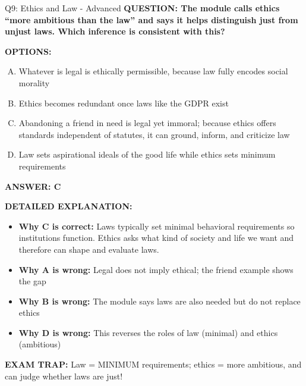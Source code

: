 \documentclass[8pt]{beamer}
\begin{document}
\begin{frame}[shrink=6]{Q9: Ethics and Law - Advanced}
\fontsize{6.5}{7.5}\selectfont
\textbf{QUESTION: The module calls ethics ``more ambitious than the law'' and says it helps distinguish just from unjust laws. Which inference is consistent with this?}

\vspace{0.1cm}
\textbf{OPTIONS:}
\begin{enumerate}[A.]
\item Whatever is legal is ethically permissible, because law fully encodes social morality
\item Ethics becomes redundant once laws like the GDPR exist
\item Abandoning a friend in need is legal yet immoral; because ethics offers standards independent of statutes, it can ground, inform, and criticize law
\item Law sets aspirational ideals of the good life while ethics sets minimum requirements
\end{enumerate}

\vspace{0.1cm}
\textcolor{myblue}{\textbf{ANSWER: C}}

\vspace{0.1cm}
\textbf{DETAILED EXPLANATION:}
\begin{itemize}
\item \textbf{Why C is correct:} Laws typically set minimal behavioral requirements so institutions function. Ethics asks what kind of society and life we want and therefore can shape and evaluate laws.
\item \textbf{Why A is wrong:} Legal does not imply ethical; the friend example shows the gap
\item \textbf{Why B is wrong:} The module says laws are also needed but do not replace ethics
\item \textbf{Why D is wrong:} This reverses the roles of law (minimal) and ethics (ambitious)
\end{itemize}

\textcolor{myred}{\textbf{EXAM TRAP:}} Law = MINIMUM requirements; ethics = more ambitious, and can judge whether laws are just!
\end{frame}

\end{document}
